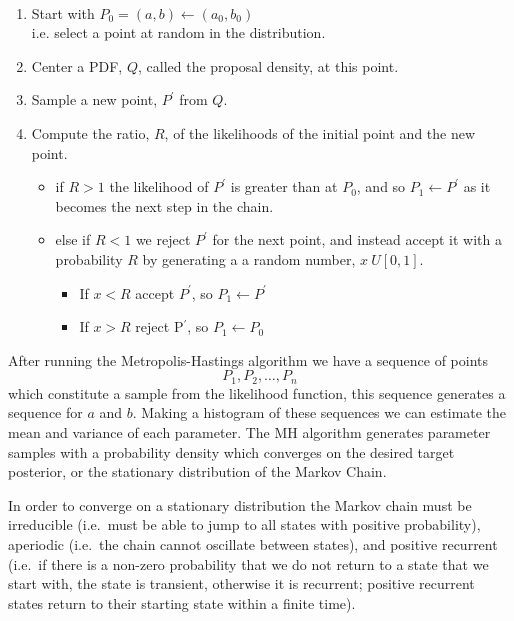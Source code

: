 \documentclass{dwnotes}         		        %
\begin{document}
\begin{algorithm}\\
\begin{enumerate}
\item Start with $P_0 = (a, b) \gets (a_0, b_0)$ \\ i.e. select a
  point at random in the distribution.
\item Center a PDF, $Q$, called the proposal density, at this point.
\item Sample a new point, $P^{\prime}$ from $Q$.
\item Compute the ratio, $R$, of the likelihoods of the initial point
  and the new point.
\begin{itemize}
\item if $R>1$ the likelihood of $P^{\prime}$ is greater than at
  $P_0$, and so $P_1 \gets P^{\prime}$ as it becomes the next step in
  the chain.
\item else if $R<1$ we reject $P^{\prime}$ for the next point, and
  instead accept it with a probability $R$ by generating a a random number, $x ~ U[0,1]$.
  \begin{itemize}
  \item If $x<R$ accept $P^{\prime}$, so $P_1 \gets P^{\prime}$
  \item If $x>R$ reject P$^{\prime}$, so $P_1 \gets P_0$
  \end{itemize}
\end{itemize}
\end{enumerate}
\end{algorithm}

After running the Metropolis-Hastings algorithm we have a sequence of points 
\[ P_1, P_2, \dots, P_n \] which constitute a sample from the
likelihood function, this sequence generates a sequence for $a$ and
$b$. Making a histogram of these sequences we can estimate the mean
and variance of each parameter. The MH algorithm generates parameter
samples with a probability density which converges on the desired
target posterior, or the stationary distribution of the Markov Chain.

In order to converge on a stationary distribution the Markov chain
must be irreducible (i.e.\ must be able to jump to all states with
positive probability), aperiodic (i.e.\ the chain cannot oscillate
between states), and positive recurrent (i.e.\ if there is a non-zero
probability that we do not return to a state that we start with, the
state is transient, otherwise it is recurrent; positive recurrent
states return to their starting state within a finite time).
\end{document}
